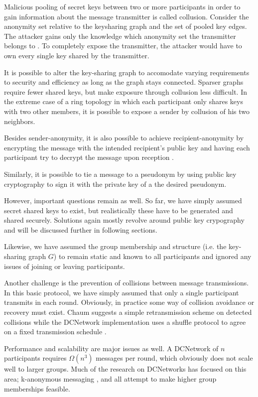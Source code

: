 Malicious pooling of secret keys between two or more participants in order to
gain information about the message transmitter is called collusion.
Consider the anonymity set relative to the keysharing graph and the set of pooled key edges.
The attacker gains only the knowledge which anonymity set the transmitter belongs to \cite{journals/joc/Chaum88}. To completely expose the transmitter, the attacker would
have to own every single key shared by the transmitter.

It is possible to alter the key-sharing graph to accomodate varying requirements to
security and efficiency as long as the graph stays connected. Sparser graphs require fewer
shared keys, but make exposure through collusion less difficult. In the extreme case of
a ring topology in which each participant only shares keys with two other members, it is
possible to expose a sender by collusion of his two neighbors.

Besides sender-anonymity, it is also possible to achieve recipient-anonymity by
encrypting the message with the intended recipient's public key and having each
participant try to decrypt the message upon reception \cite{journals/joc/Chaum88}.

Similarly, it is possible to tie a message to a pseudonym by using public key cryptography
to sign it with the private key of a the desired pseudonym.

However, important questions remain as well. So far, we have simply assumed secret shared keys
to exist, but realistically these have to be generated and shared securely. Solutions
again mostly revolve around public key crypography and will be discussed further in
following sections.

Likewise, we have assumed the group membership and structure (i.e. the key-sharing graph $G$)
to remain static and known to all participants and ignored any issues of joining or leaving participants.

Another challenge is the prevention of collisions between message transmissions.
In this basic protocol, we have simply assumed that only a single participant transmits
in each round. Obviously, in practice some way of collision avoidance or recovery must exist.
Chaum suggests a simple retransmission scheme on detected collisions \cite{journals/joc/Chaum88}
while the \ac{DCNetwork} implementation \Dissent uses a shuffle protocol to agree on
a fixed transmission schedule \cite{journals/corr/abs-1004-3057}.

Performance and scalability are major issues as well. A \ac{DCNetwork} of $n$ participants requires $\Omega(n^3)$ messages per round, which obviously does not scale well to larger groups.
Much of the research on \acp{DCNetwork} has focused on this area; k-anonymous messaging \cite{von2003k},
\Dissent \cite{journals/corr/abs-1004-3057} and \Verdict \cite{corrigan2013proactively}
all attempt to make higher group memberships feasible.

